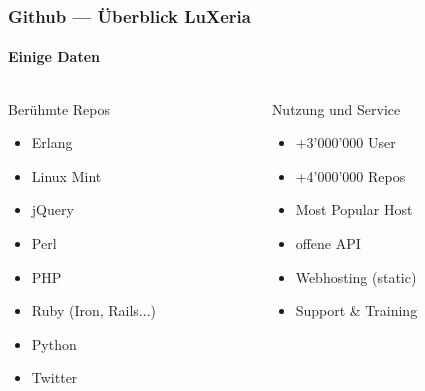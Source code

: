 \begin{frame}
	\frametitle{Github --- Überblick \hfill{} LuXeria}
	\framesubtitle{Einige Daten}
	\begin{columns}
		\begin{column}{5cm}
			\begin{block}{Berühmte Repos}
				\begin{itemize}
					\item Erlang
					\item Linux Mint
					\item jQuery
					\item Perl
					\item PHP
					\item Ruby (Iron, Rails...)
					\item Python
					\item Twitter
				\end{itemize}
			\end{block}
		\end{column}
		\begin{column}{5cm}
			\begin{block}{Nutzung und Service}
				\begin{itemize}
					\item +3'000'000 User
					\item +4'000'000 Repos
					\item Most Popular Host
					\item offene API
					\item Webhosting (static)
					\item Support \& Training
				\end{itemize}
			\end{block}
		\end{column}
	\end{columns}
\end{frame}

